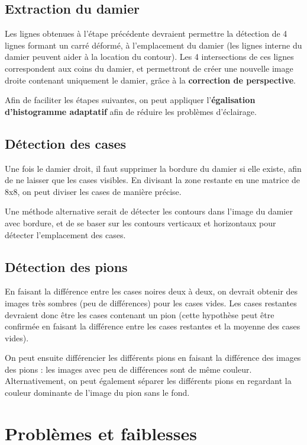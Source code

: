 \documentclass[a4paper, 12pt]{report}
\begin{document}
\subsection*{Extraction du damier}

Les lignes obtenues à l'étape précédente devraient permettre la détection de 4 lignes formant un carré déformé, à l'emplacement du damier (les lignes interne du damier peuvent aider à la location du contour). Les 4 intersections de ces lignes correspondent aux coins du damier, et permettront de créer une nouvelle image droite contenant uniquement le damier, grâce à la \textbf{correction de perspective}.

Afin de faciliter les étapes suivantes, on peut appliquer l'\textbf{égalisation d'histogramme adaptatif} afin de réduire les problèmes d'éclairage.

\subsection*{Détection des cases}

Une fois le damier droit, il faut supprimer la bordure du damier si elle existe, afin de ne laisser que les cases visibles. En divisant la zone restante en une matrice de 8x8, on peut diviser les cases de manière précise.

Une méthode alternative serait de détecter les contours dans l'image du damier avec bordure, et de se baser sur les contours verticaux et horizontaux pour détecter l'emplacement des cases.

\subsection*{Détection des pions}

En faisant la différence entre les cases noires deux à deux, on devrait obtenir des images très sombres (peu de différences) pour les cases vides. Les cases restantes devraient donc être les cases contenant un pion (cette hypothèse peut être confirmée en faisant la différence entre les cases restantes et la moyenne des cases vides).

On peut ensuite différencier les différents pions en faisant la différence des images des pions : les images avec peu de différences sont de même couleur. Alternativement, on peut également séparer les différents pions en regardant la couleur dominante de l'image du pion sans le fond.

\section{Problèmes et faiblesses}
\end{document}
